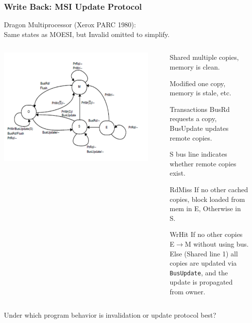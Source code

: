 \documentclass{beamer}
\newcommand{\emp}[1]{\textcolor{DikuRed}{ #1}}
\begin{document}
\begin{frame}[fragile,t]
\frametitle{Write Back: MSI Update Protocol}

Dragon Multiprocessor (Xerox PARC 1980):\\
Same states as MOESI, but Invalid omitted to simplify.

\begin{columns}\hspace{-7ex}
\includegraphics[width=40ex]{Figures/FigsInfCoherence/MSIupdate}\pause
{}
\begin{scriptsize}
\begin{itemize}
    \item[Shared] multiple copies, memory is clean. 
    \item[Modified] one copy, memory is stale, etc.
    \item[Transactions] BusRd requests a copy, BusUpdate updates remote copies.
    \item[S bus line] indicates whether remote copies exist.\bigskip
    \item[RdMiss] If no other cached copies, block loaded from mem in E,
                   Otherwise in S.\\
    \item[WrHit] If no other copies E$\rightarrow$M without using bus.\\
                 \emp{Else (Shared line 1) all copies are updated via 
                    {\tt BusUpdate}, and the update is propagated from owner.}  
\end{itemize}
\end{scriptsize}
\end{columns}
\bigskip
Under which program behavior is invalidation or update protocol best?

\end{frame}
\end{document}
